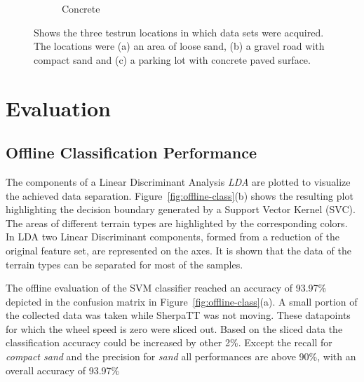 \documentclass{article}
\begin{document}
\begin{figure}[!htb]
\begin{subfigure}[t]{0.32\textwidth}
        \caption{Concrete}
    \end{subfigure}
 \caption{Shows the three testrun locations in which data sets were acquired. The locations were (a) an area of loose sand, (b) a gravel road with compact sand and (c) a parking lot with concrete paved surface. \label{fig:TestLocs}}
\end{figure}


\section{Evaluation}
\subsection{Offline Classification Performance}



The components of a Linear Discriminant Analysis \emph{LDA} are plotted to visualize the achieved data separation. Figure~\ref{fig:offline-class}(b) shows the resulting plot highlighting the decision boundary generated by a Support Vector Kernel (SVC). The areas of different terrain types are highlighted by the corresponding colors. In LDA two Linear Discriminant components, formed from a reduction of the original feature set, are represented on the axes. It is shown that the data of the terrain types can be separated for most of the samples.  

The offline evaluation of the SVM classifier reached an accuracy of 93.97\% depicted in the confusion matrix in Figure~\ref{fig:offline-class}(a). A small portion of the collected data was taken while SherpaTT was not moving. These datapoints for which the wheel speed is zero were sliced out. Based on the sliced data the classification accuracy could be increased by other 2\%. Except the recall for \emph{compact sand} and the precision for \emph{sand} all performances are above 90\%, with an overall accuracy of 93.97\%
\end{document}
